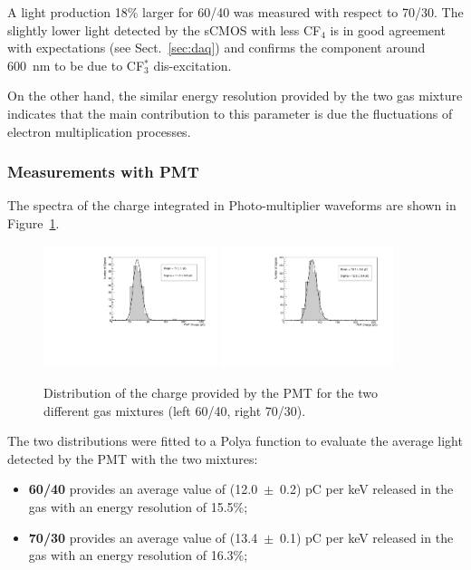 \documentclass[a4paper,11pt]{article}
\begin{document}
A light production 18\% larger for 60/40 was measured with respect to 70/30. The slightly lower light detected by the sCMOS with less CF$_4$ is in good agreement with expectations (see Sect.~\ref{sec:daq}) and confirms the component around 600~nm to be due to CF$^*_3$ dis-excitation.

On the other hand, the similar energy resolution provided by the two gas mixture indicates that the main contribution to this parameter is due the fluctuations of electron multiplication processes.

\subsubsection{Measurements with PMT}

The spectra of the charge integrated in Photo-multiplier waveforms
are shown in Figure~\ref{fig:peaksPMT}.

\begin{figure}[ht]
\centering
\includegraphics[width=0.45\textwidth]{Figures/newlightCharge_Run1834_Mix60-40.pdf}
\includegraphics[width=0.45\textwidth]{Figures/newlightCharge_Run2277_Mix70-30.pdf}
\caption{Distribution of the charge provided by the PMT for the two different gas mixtures (left 60/40, right 70/30).} 
\label{fig:peaksPMT}
\end{figure}

The two distributions were fitted to a Polya function to evaluate the average light detected by the PMT with the two mixtures:
\begin{itemize}
    \item {\bf 60/40} provides an average value of (12.0~$\pm$~0.2) pC per keV released in the gas with an energy resolution of 15.5\%;
    \item {\bf 70/30} provides an average value of (13.4~$\pm$~0.1) pC per keV released in the gas with an energy resolution of 16.3\%;
\end{itemize}
\end{document}
